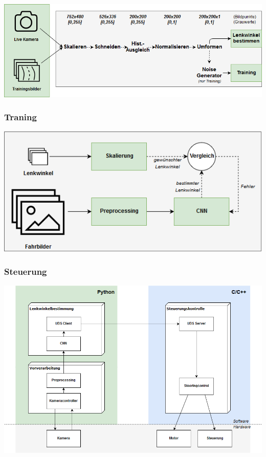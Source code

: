 \documentclass{beamer}
\begin{document}
\begin{frame}
\includegraphics[width=\linewidth]{figures/Pipeline.png}	




\end{frame}

\begin{frame}
\frametitle{Traning}
\includegraphics[width=\linewidth]{figures/Lernarchitektur.png}	 
\end{frame}

\begin{frame}
\frametitle{Steuerung}
\includegraphics[width=\linewidth]{figures/Steuerung.png}	 

\end{frame}
\end{document}
